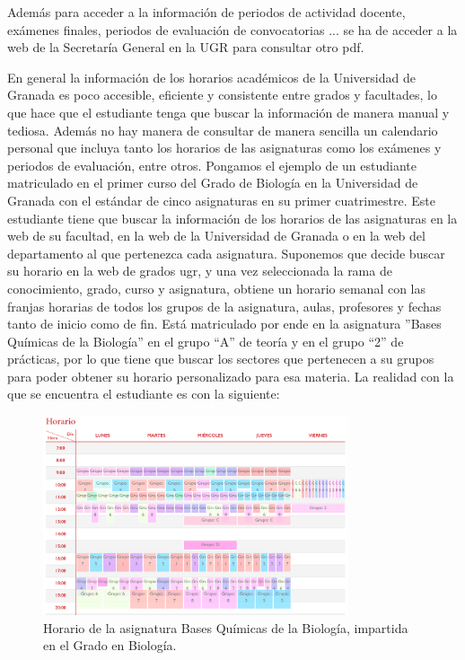 Además para acceder a la información de periodos de actividad docente, exámenes finales, periodos de evaluación de convocatorias ... se ha de acceder a la web de la Secretaría General en la UGR \cite{webSecretaria} para consultar otro pdf.

En general la información de los horarios académicos de la Universidad de Granada es poco accesible, eficiente y consistente entre grados y facultades, lo que hace que el estudiante tenga que buscar la información de manera manual y tediosa.
Además no hay manera de consultar de manera sencilla un calendario personal que incluya tanto los horarios de las asignaturas como los exámenes y periodos de evaluación, entre otros.
\newline\newline
Pongamos el ejemplo de un estudiante matriculado en el primer curso del Grado de Biología en la Universidad de Granada con el estándar de cinco asignaturas en su primer cuatrimestre. 
Este estudiante tiene que buscar la información de los horarios de las asignaturas en la web de su facultad, en la web de la Universidad de Granada o en la web del departamento al que pertenezca cada asignatura.
Suponemos que decide buscar su horario en la web de grados ugr, y una vez seleccionada la rama de conocimiento, grado, curso y asignatura, obtiene un horario semanal con las franjas horarias de todos los grupos de la asignatura, aulas, profesores y fechas tanto de inicio como de fin.
Está matriculado por ende en la asignatura ''Bases Químicas de la Biología'' en el grupo ``A'' de teoría y en el grupo ``2'' de prácticas, por lo que tiene que buscar los sectores que pertenecen a su grupos para poder obtener su horario personalizado para esa materia.
\newline\newline
La realidad con la que se encuentra el estudiante es con la siguiente:

\begin{figure}[H]
    \centering
    \includegraphics[width=0.8\textwidth]{figures/02_horario_biologia.png}
    \caption{Horario de la asignatura Bases Químicas de la Biología, impartida en el Grado en Biología.}
    \label{fig:horario_biologia}
\end{figure}

